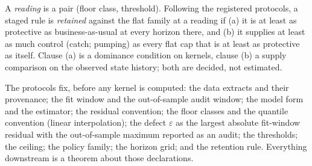 A \emph{reading} is a pair (floor class, threshold). Following the registered protocols, a staged rule is \emph{retained} against the flat family at a reading if (a) it is at least as protective as business-as-usual at every horizon there, and (b) it supplies at least as much control (catch; pumping) as every flat cap that is at least as protective as itself. Clause (a) is a dominance condition on kernels, clause (b) a supply comparison on the observed state history; both are decided, not estimated.

The protocols fix, before any kernel is computed: the data extracts and their provenance; the fit window and the out-of-sample audit window; the model form and the estimator; the residual convention; the floor classes and the quantile convention (linear interpolation); the defect $\varepsilon$ as the largest absolute fit-window residual with the out-of-sample maximum reported as an audit; the thresholds; the ceiling; the policy family; the horizon grid; and the retention rule. Everything downstream is a theorem about those declarations.
